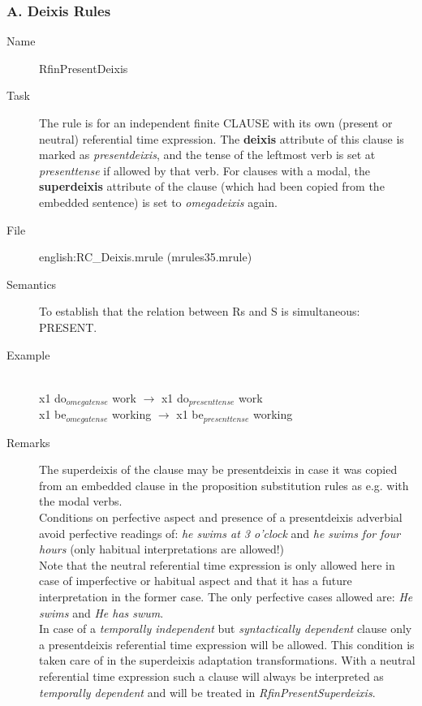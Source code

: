 \begin{description}
\subsubsection{A. Deixis Rules}
\begin{description}
\item[Name] RfinPresentDeixis
\item[Task] The rule is for an independent finite CLAUSE with its own (present 
or
neutral) referential time expression. The {\bf deixis} attribute of this clause
is marked as {\em presentdeixis\/}, and the tense of the leftmost verb is set
at {\em presenttense\/} if allowed by that verb. 
For clauses with a modal, the {\bf superdeixis}
attribute of the clause (which had been copied from the embedded sentence) is 
set to {\em omegadeixis\/} again. 
\item[File] english:RC\_Deixis.mrule (mrules35.mrule)
\item[Semantics] To establish that the relation between Rs and S is 
simultaneous: PRESENT. 
\item[Example] \mbox{}\\
 x1 do$_{omegatense}$ work $\rightarrow$ x1 do$_{presenttense}$ work \\
 x1 be$_{omegatense}$ working $\rightarrow$ x1 be$_{presenttense}$ working
\item[Remarks] 
The superdeixis of the clause may be presentdeixis in 
case it was copied from an embedded clause in the proposition substitution 
rules as e.g. with the modal verbs. \\
Conditions on perfective aspect and presence of a presentdeixis adverbial avoid
perfective readings of:
{\em he swims at 3 o'clock} and {\em he swims for four hours}
(only  habitual interpretations are allowed!)\\
Note that the neutral referential time expression is only allowed here  in case 
of imperfective or habitual aspect and that it has a future interpretation in 
the former case. The only perfective cases allowed are: {\em He swims} and 
{\em He has swum}.\\
In case of a {\em temporally independent} but {\em syntactically dependent} 
clause only a presentdeixis referential time expression will be allowed. This 
condition is taken care of in the superdeixis adaptation transformations. With 
a neutral referential time expression such a clause will always be interpreted 
as {\em temporally dependent} and will be treated in {\em 
RfinPresentSuperdeixis}.  
\end{description}


\end{description}
